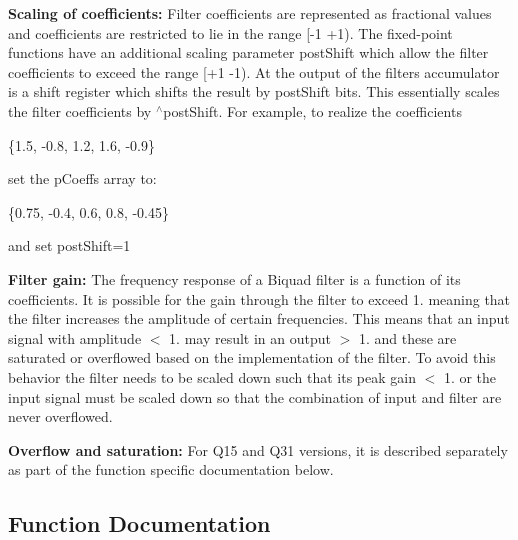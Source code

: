 \begin{DoxyParagraph}{}
{\bfseries Scaling of coefficients\+: } Filter coefficients are represented as fractional values and coefficients are restricted to lie in the range {\ttfamily \mbox{[}-\/1 +1)}. The fixed-\/point functions have an additional scaling parameter {\ttfamily post\+Shift} which allow the filter coefficients to exceed the range {\ttfamily \mbox{[}+1 -\/1)}. At the output of the filter\textquotesingle{}s accumulator is a shift register which shifts the result by {\ttfamily post\+Shift} bits. This essentially scales the filter coefficients by {$^\wedge$post\+Shift}. For example, to realize the coefficients 
\begin{DoxyPre}
   \{1.5, -0.8, 1.2, 1.6, -0.9\}
\end{DoxyPre}
 set the p\+Coeffs array to\+: 
\begin{DoxyPre}
   \{0.75, -0.4, 0.6, 0.8, -0.45\}
\end{DoxyPre}
 and set {\ttfamily post\+Shift=1}
\end{DoxyParagraph}
\begin{DoxyParagraph}{}
{\bfseries Filter gain\+: } The frequency response of a Biquad filter is a function of its coefficients. It is possible for the gain through the filter to exceed 1. meaning that the filter increases the amplitude of certain frequencies. This means that an input signal with amplitude $<$ 1. may result in an output $>$ 1. and these are saturated or overflowed based on the implementation of the filter. To avoid this behavior the filter needs to be scaled down such that its peak gain $<$ 1. or the input signal must be scaled down so that the combination of input and filter are never overflowed.
\end{DoxyParagraph}
\begin{DoxyParagraph}{}
{\bfseries Overflow and saturation\+: } For Q15 and Q31 versions, it is described separately as part of the function specific documentation below. 
\end{DoxyParagraph}


\subsection{Function Documentation}
